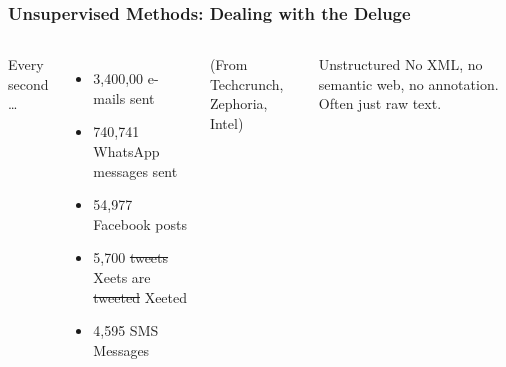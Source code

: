 \documentclass[compress]{beamer}
\begin{document}
\begin{frame}
\frametitle{Unsupervised Methods: Dealing with the Deluge}

\begin{columns}


Every second \dots
\begin{itemize}
\item 3,400,00 e-mails sent
\item 740,741 WhatsApp messages sent
  \item 54,977 Facebook posts  
  \item 5,700 \sout{tweets} Xeets are \sout{tweeted} Xeeted
    \item 4,595 SMS Messages
    \end{itemize}
    (From Techcrunch, Zephoria, Intel)
\pause

\begin{block}{Unstructured}
  No XML, no semantic web, no annotation.  Often just raw text.
\end{block}



\end{columns}

\end{frame}
\end{document}
